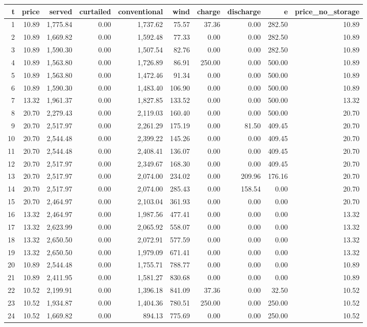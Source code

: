 \begin{tabular}{rrrrrrrrrr}
\toprule
t & price & served & curtailed & conventional & wind & charge & discharge & e & price\_no\_storage \\
\midrule
1 & 10.89 & 1,775.84 & 0.00 & 1,737.62 & 75.57 & 37.36 & 0.00 & 282.50 & 10.89 \\
2 & 10.89 & 1,669.82 & 0.00 & 1,592.48 & 77.33 & 0.00 & 0.00 & 282.50 & 10.89 \\
3 & 10.89 & 1,590.30 & 0.00 & 1,507.54 & 82.76 & 0.00 & 0.00 & 282.50 & 10.89 \\
4 & 10.89 & 1,563.80 & 0.00 & 1,726.89 & 86.91 & 250.00 & 0.00 & 500.00 & 10.89 \\
5 & 10.89 & 1,563.80 & 0.00 & 1,472.46 & 91.34 & 0.00 & 0.00 & 500.00 & 10.89 \\
6 & 10.89 & 1,590.30 & 0.00 & 1,483.40 & 106.90 & 0.00 & 0.00 & 500.00 & 10.89 \\
7 & 13.32 & 1,961.37 & 0.00 & 1,827.85 & 133.52 & 0.00 & 0.00 & 500.00 & 13.32 \\
8 & 20.70 & 2,279.43 & 0.00 & 2,119.03 & 160.40 & 0.00 & 0.00 & 500.00 & 20.70 \\
9 & 20.70 & 2,517.97 & 0.00 & 2,261.29 & 175.19 & 0.00 & 81.50 & 409.45 & 20.70 \\
10 & 20.70 & 2,544.48 & 0.00 & 2,399.22 & 145.26 & 0.00 & 0.00 & 409.45 & 20.70 \\
11 & 20.70 & 2,544.48 & 0.00 & 2,408.41 & 136.07 & 0.00 & 0.00 & 409.45 & 20.70 \\
12 & 20.70 & 2,517.97 & 0.00 & 2,349.67 & 168.30 & 0.00 & 0.00 & 409.45 & 20.70 \\
13 & 20.70 & 2,517.97 & 0.00 & 2,074.00 & 234.02 & 0.00 & 209.96 & 176.16 & 20.70 \\
14 & 20.70 & 2,517.97 & 0.00 & 2,074.00 & 285.43 & 0.00 & 158.54 & 0.00 & 20.70 \\
15 & 20.70 & 2,464.97 & 0.00 & 2,103.04 & 361.93 & 0.00 & 0.00 & 0.00 & 20.70 \\
16 & 13.32 & 2,464.97 & 0.00 & 1,987.56 & 477.41 & 0.00 & 0.00 & 0.00 & 13.32 \\
17 & 13.32 & 2,623.99 & 0.00 & 2,065.92 & 558.07 & 0.00 & 0.00 & 0.00 & 13.32 \\
18 & 13.32 & 2,650.50 & 0.00 & 2,072.91 & 577.59 & 0.00 & 0.00 & 0.00 & 13.32 \\
19 & 13.32 & 2,650.50 & 0.00 & 1,979.09 & 671.41 & 0.00 & 0.00 & 0.00 & 13.32 \\
20 & 10.89 & 2,544.48 & 0.00 & 1,755.71 & 788.77 & 0.00 & 0.00 & 0.00 & 10.89 \\
21 & 10.89 & 2,411.95 & 0.00 & 1,581.27 & 830.68 & 0.00 & 0.00 & 0.00 & 10.89 \\
22 & 10.52 & 2,199.91 & 0.00 & 1,396.18 & 841.09 & 37.36 & 0.00 & 32.50 & 10.52 \\
23 & 10.52 & 1,934.87 & 0.00 & 1,404.36 & 780.51 & 250.00 & 0.00 & 250.00 & 10.52 \\
24 & 10.52 & 1,669.82 & 0.00 & 894.13 & 775.69 & 0.00 & 0.00 & 250.00 & 10.52 \\
\bottomrule
\end{tabular}
